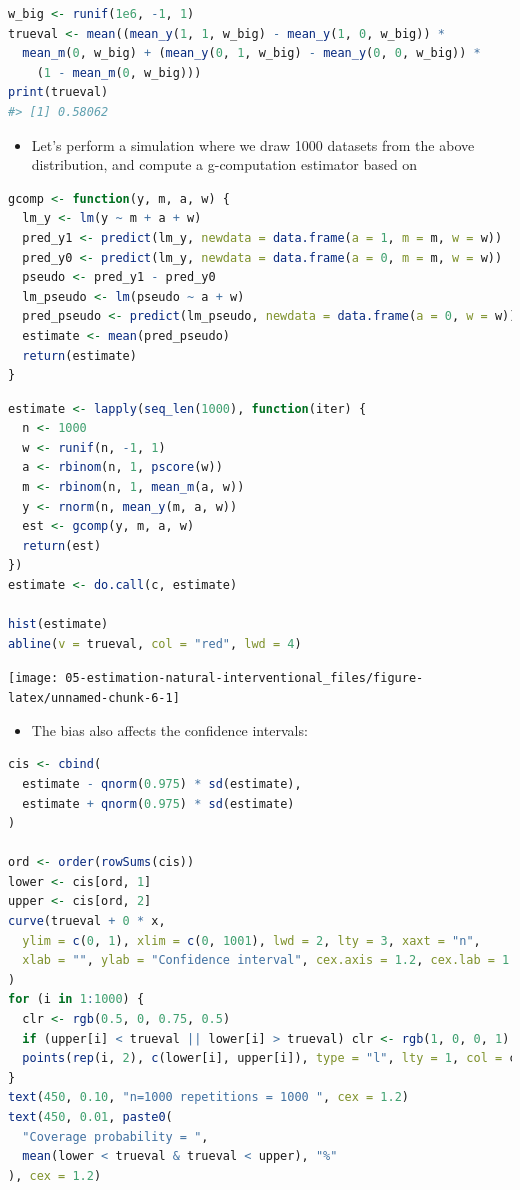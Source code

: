\documentclass[
  12pt,
]{book}
\providecommand{\tightlist}{%
  \setlength{\itemsep}{0pt}\setlength{\parskip}{0pt}}
\theoremstyle{definition}
\theoremstyle{definition}
\theoremstyle{definition}
\newcommand{\1}{\mathbbm{1}}
\begin{document}
\begin{lstlisting}[language=R]
w_big <- runif(1e6, -1, 1)
trueval <- mean((mean_y(1, 1, w_big) - mean_y(1, 0, w_big)) *
  mean_m(0, w_big) + (mean_y(0, 1, w_big) - mean_y(0, 0, w_big)) *
    (1 - mean_m(0, w_big)))
print(trueval)
#> [1] 0.58062
\end{lstlisting}

\begin{itemize}
\tightlist
\item
  Let's perform a simulation where we draw 1000 datasets from the above
  distribution, and compute a g-computation estimator based on
\end{itemize}

\begin{lstlisting}[language=R]
gcomp <- function(y, m, a, w) {
  lm_y <- lm(y ~ m + a + w)
  pred_y1 <- predict(lm_y, newdata = data.frame(a = 1, m = m, w = w))
  pred_y0 <- predict(lm_y, newdata = data.frame(a = 0, m = m, w = w))
  pseudo <- pred_y1 - pred_y0
  lm_pseudo <- lm(pseudo ~ a + w)
  pred_pseudo <- predict(lm_pseudo, newdata = data.frame(a = 0, w = w))
  estimate <- mean(pred_pseudo)
  return(estimate)
}
\end{lstlisting}

\begin{lstlisting}[language=R]
estimate <- lapply(seq_len(1000), function(iter) {
  n <- 1000
  w <- runif(n, -1, 1)
  a <- rbinom(n, 1, pscore(w))
  m <- rbinom(n, 1, mean_m(a, w))
  y <- rnorm(n, mean_y(m, a, w))
  est <- gcomp(y, m, a, w)
  return(est)
})
estimate <- do.call(c, estimate)

hist(estimate)
abline(v = trueval, col = "red", lwd = 4)
\end{lstlisting}

\begin{center}\texttt{[image: 05-estimation-natural-interventional\_files/figure-latex/unnamed-chunk-6-1]} \end{center}

\begin{itemize}
\tightlist
\item
  The bias also affects the confidence intervals:
\end{itemize}

\begin{lstlisting}[language=R]
cis <- cbind(
  estimate - qnorm(0.975) * sd(estimate),
  estimate + qnorm(0.975) * sd(estimate)
)

ord <- order(rowSums(cis))
lower <- cis[ord, 1]
upper <- cis[ord, 2]
curve(trueval + 0 * x,
  ylim = c(0, 1), xlim = c(0, 1001), lwd = 2, lty = 3, xaxt = "n",
  xlab = "", ylab = "Confidence interval", cex.axis = 1.2, cex.lab = 1.2
)
for (i in 1:1000) {
  clr <- rgb(0.5, 0, 0.75, 0.5)
  if (upper[i] < trueval || lower[i] > trueval) clr <- rgb(1, 0, 0, 1)
  points(rep(i, 2), c(lower[i], upper[i]), type = "l", lty = 1, col = clr)
}
text(450, 0.10, "n=1000 repetitions = 1000 ", cex = 1.2)
text(450, 0.01, paste0(
  "Coverage probability = ",
  mean(lower < trueval & trueval < upper), "%"
), cex = 1.2)
\end{lstlisting}
\end{document}
